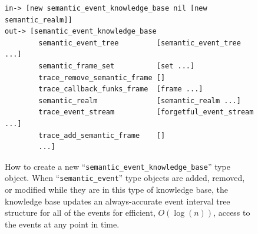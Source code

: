 \begin{figure}[h]
\centering
{\scriptsize
\begin{Verbatim}[frame=single]
 in-> [new semantic_event_knowledge_base nil [new semantic_realm]]
out-> [semantic_event_knowledge_base
        semantic_event_tree         [semantic_event_tree ...]
        semantic_frame_set          [set ...]
        trace_remove_semantic_frame []
        trace_callback_funks_frame  [frame ...]
        semantic_realm              [semantic_realm ...]
        trace_event_stream          [forgetful_event_stream ...]
        trace_add_semantic_frame    []
        ...]
\end{Verbatim}
}
\caption[How to create a new
  ``{\tt{semantic\_event\_knowledge\_base}}'' type object.]{How to
  create a new ``{\tt{semantic\_event\_knowledge\_base}}'' type
  object.  When ``{\tt{semantic\_event}}'' type objects are added,
  removed, or modified while they are in this type of knowledge base,
  the knowledge base updates an always-accurate event interval tree
  structure for all of the events for efficient, $O(\log{(n)})$,
  access to the events at any point in time.}
\label{figure:semantic_event_knowledge_base}
\end{figure}

